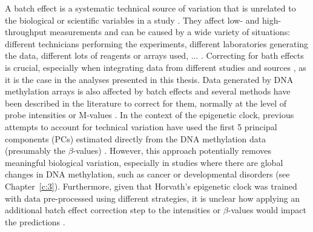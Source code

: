 \bigskip

A batch effect is a systematic technical source of variation that is unrelated to the biological or scientific variables in a study \cite{Leek2010}. They affect low- and high-throughput measurements and can be caused by a wide variety of situations: different technicians performing the experiments, different laboratories generating the data, different lots of reagents or arrays used, ... \cite{Leek2010}. Correcting for bath effects is crucial, especially when integrating data from different studies and sources \cite{Maksimovic2015}, as it is the case in the analyses presented in this thesis. Data generated by DNA methylation arrays is also affected by batch effects and several methods have been described in the literature to correct for them, normally at the level of probe intensities \cite{Fortin2014} or M-values \cite{Maksimovic2015,Price2018}. In the context of the epigenetic clock, previous attempts to account for technical variation have used the first 5 principal components (PCs) estimated directly from the DNA methylation data (presumably the $\beta$-values) \cite{Horvath2016a}. However, this approach potentially removes meaningful biological variation, especially in studies where there are global changes in DNA methylation, such as cancer \cite{Fortin2014} or developmental disorders (see Chapter~\ref{c:3}). Furthermore, given that Horvath's epigenetic clock was trained with data pre-processed using different strategies, it is unclear how applying an additional batch effect correction step to the intensities or $\beta$-values would impact the predictions \cite{Horvath2013a}.

\bigskip

